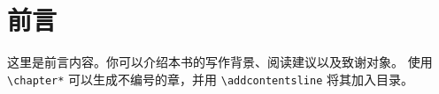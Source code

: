 \chapter*{前言}
这里是前言内容。你可以介绍本书的写作背景、阅读建议以及致谢对象。
使用 \verb|\chapter*| 可以生成不编号的章，并用 \verb|\addcontentsline| 将其加入目录。